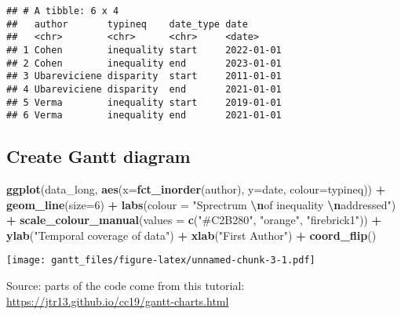 \documentclass[
]{article}
\newenvironment{Shaded}{\begin{snugshade}}{\end{snugshade}}
\newcommand{\AttributeTok}[1]{\textcolor[rgb]{0.13,0.29,0.53}{#1}}
\newcommand{\DecValTok}[1]{\textcolor[rgb]{0.00,0.00,0.81}{#1}}
\newcommand{\FunctionTok}[1]{\textcolor[rgb]{0.13,0.29,0.53}{\textbf{#1}}}
\newcommand{\NormalTok}[1]{#1}
\newcommand{\SpecialCharTok}[1]{\textcolor[rgb]{0.81,0.36,0.00}{\textbf{#1}}}
\newcommand{\StringTok}[1]{\textcolor[rgb]{0.31,0.60,0.02}{#1}}
\begin{document}
\begin{verbatim}
## # A tibble: 6 x 4
##   author       typineq    date_type date      
##   <chr>        <chr>      <chr>     <date>    
## 1 Cohen        inequality start     2022-01-01
## 2 Cohen        inequality end       2023-01-01
## 3 Ubareviciene disparity  start     2011-01-01
## 4 Ubareviciene disparity  end       2021-01-01
## 5 Verma        inequality start     2019-01-01
## 6 Verma        inequality end       2021-01-01
\end{verbatim}

\hypertarget{create-gantt-diagram}{%
\subsection{Create Gantt diagram}\label{create-gantt-diagram}}

\begin{Shaded}
\begin{Highlighting}[]
\FunctionTok{ggplot}\NormalTok{(data\_long, }\FunctionTok{aes}\NormalTok{(}\AttributeTok{x=}\FunctionTok{fct\_inorder}\NormalTok{(author), }\AttributeTok{y=}\NormalTok{date, }\AttributeTok{colour=}\NormalTok{typineq)) }\SpecialCharTok{+}
  \FunctionTok{geom\_line}\NormalTok{(}\AttributeTok{size=}\DecValTok{6}\NormalTok{) }\SpecialCharTok{+} \FunctionTok{labs}\NormalTok{(}\AttributeTok{colour =} \StringTok{"Sprectrum }\SpecialCharTok{\textbackslash{}n}\StringTok{of inequality }\SpecialCharTok{\textbackslash{}n}\StringTok{addressed"}\NormalTok{) }\SpecialCharTok{+}
  \FunctionTok{scale\_colour\_manual}\NormalTok{(}\AttributeTok{values =} \FunctionTok{c}\NormalTok{(}\StringTok{"\#C2B280"}\NormalTok{, }\StringTok{"orange"}\NormalTok{, }\StringTok{"firebrick1"}\NormalTok{)) }\SpecialCharTok{+}
  \FunctionTok{ylab}\NormalTok{(}\StringTok{"Temporal coverage of data"}\NormalTok{) }\SpecialCharTok{+} \FunctionTok{xlab}\NormalTok{(}\StringTok{"First Author"}\NormalTok{) }\SpecialCharTok{+}
  \FunctionTok{coord\_flip}\NormalTok{() }
\end{Highlighting}
\end{Shaded}

\texttt{[image: gantt\_files/figure-latex/unnamed-chunk-3-1.pdf]}

Source: parts of the code come from this tutorial:
\url{https://jtr13.github.io/cc19/gantt-charts.html}
\end{document}
